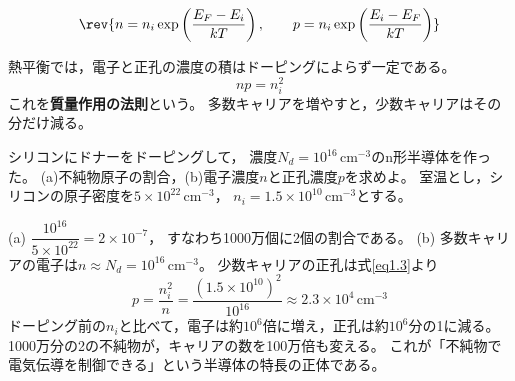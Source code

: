 \begin{equation}
\rev{n = n_i \exp\left(\frac{E_F - E_i}{kT}\right),\qquad
p = n_i \exp\left(\frac{E_i - E_F}{kT}\right)}
\label{eq1.3a}
\end{equation}

熱平衡では，電子と正孔の濃度の積はドーピングによらず一定である。
\begin{equation}
np = n_i^2
\label{eq1.3}
\end{equation}
これを\textbf{質量作用の法則}という。
多数キャリアを増やすと，少数キャリアはその分だけ減る。

\begin{例題}[ドーピングとキャリア濃度]
\label{rei1.1}
シリコンにドナーをドーピングして，
濃度$N_d = 10^{16}\,\mathrm{cm^{-3}}$のn形半導体を作った。
(a)不純物原子の割合，(b)電子濃度$n$と正孔濃度$p$を求めよ。
室温とし，シリコンの原子密度を$5\times10^{22}\,\mathrm{cm^{-3}}$，
$n_i = 1.5\times10^{10}\,\mathrm{cm^{-3}}$とする。
\begin{解答}
(a) $\dfrac{10^{16}}{5\times10^{22}} = 2\times10^{-7}$，
すなわち1000万個に2個の割合である。
(b) 多数キャリアの電子は$n \approx N_d = 10^{16}\,\mathrm{cm^{-3}}$。
少数キャリアの正孔は式\ref{eq1.3}より
\begin{equation*}
p = \frac{n_i^2}{n} = \frac{(1.5\times10^{10})^2}{10^{16}}
\approx 2.3\times10^{4}\,\mathrm{cm^{-3}}
\end{equation*}
ドーピング前の$n_i$と比べて，電子は約$10^6$倍に増え，正孔は約$10^6$分の1に減る。
1000万分の2の不純物が，キャリアの数を100万倍も変える。
これが「不純物で電気伝導を制御できる」という半導体の特長の正体である。
\end{解答}
\end{例題}

